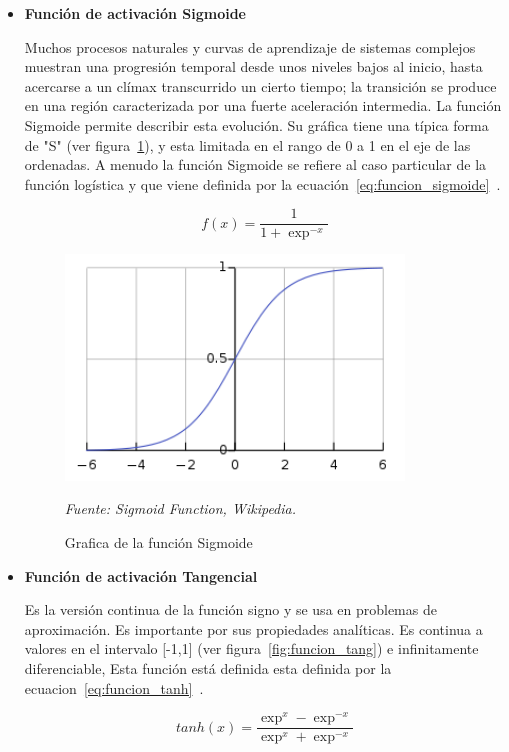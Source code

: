\begin{itemize}
\item \textbf{Función de activación Sigmoide}

Muchos procesos naturales y curvas de aprendizaje de sistemas complejos muestran una progresión temporal desde unos niveles bajos al inicio, hasta acercarse a un clímax transcurrido un cierto tiempo; la transición se produce en una región caracterizada por una fuerte aceleración intermedia. La función Sigmoide permite describir esta evolución. Su gráfica tiene una típica forma de "S" (ver figura~\ref{fig:funcion_sigmoid}), y esta limitada en el rango de 0 a 1 en el eje de las ordenadas. A menudo la función Sigmoide se refiere al caso particular de la función logística y que viene definida por la ecuación~\ref{eq:funcion_sigmoide}~\cite{24fsigmoide}.

\begin{equation}\label{eq:funcion_sigmoide}
f(x) = \frac{1}{1+\exp^{-x}}
\end{equation}

\begin{figure}[H]
		\centering
		\includegraphics[width=90mm]{Imagenes/fSigmoid.png}
		\caption{Grafica de la función Sigmoide}
		\vspace{0.15cm}
		\textit{Fuente: Sigmoid Function, Wikipedia.}
		\label{fig:funcion_sigmoid}
\end{figure} 

\item \textbf{Función de activación Tangencial}

Es la versión continua de la función signo y se usa en problemas de aproximación. Es importante por sus propiedades analíticas. Es continua a valores en el intervalo [-1,1] (ver figura~\ref{fig:funcion_tang}) e infinitamente diferenciable, Esta función está definida esta definida por la ecuacion~\ref{eq:funcion_tanh}~\cite{25ftangencial}.

\begin{equation}\label{eq:funcion_tanh}
tanh(x) = \frac{\exp^x - \exp^{-x}}{\exp^x + \exp^{-x}}
\end{equation}


\end{itemize}
